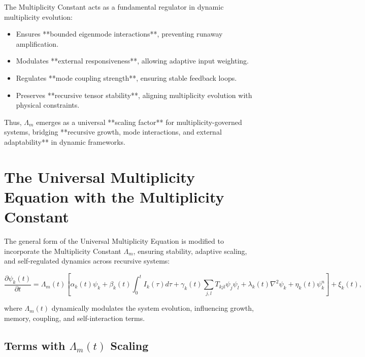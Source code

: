 \documentclass{article}
\theoremstyle{plain}
\begin{document}
The Multiplicity Constant acts as a fundamental regulator in dynamic multiplicity evolution:

\begin{itemize}
    \item Ensures **bounded eigenmode interactions**, preventing runaway amplification.
    \item Modulates **external responsiveness**, allowing adaptive input weighting.
    \item Regulates **mode coupling strength**, ensuring stable feedback loops.
    \item Preserves **recursive tensor stability**, aligning multiplicity evolution with physical constraints.
\end{itemize}

Thus, \( \Lambda_m \) emerges as a universal **scaling factor** for multiplicity-governed systems, bridging **recursive growth, mode interactions, and external adaptability** in dynamic frameworks.


\section{The Universal Multiplicity Equation with the Multiplicity Constant}

The general form of the Universal Multiplicity Equation is modified to incorporate the Multiplicity Constant \( \Lambda_m \), ensuring stability, adaptive scaling, and self-regulated dynamics across recursive systems:

\begin{equation}
\frac{\partial \psi_k(t)}{\partial t} = \Lambda_m(t) \left[ \alpha_k(t) \psi_k + \beta_k(t) \int_0^t I_k(\tau) d\tau + \gamma_k(t) \sum_{j,l} T_{kjl} \psi_j \psi_l + \lambda_k(t) \nabla^2 \psi_k + \eta_k(t) \psi_k^n \right] + \xi_k(t),
\end{equation}

where \( \Lambda_m(t) \) dynamically modulates the system evolution, influencing growth, memory, coupling, and self-interaction terms.

\subsection{Terms with \( \Lambda_m(t) \) Scaling}
\end{document}
